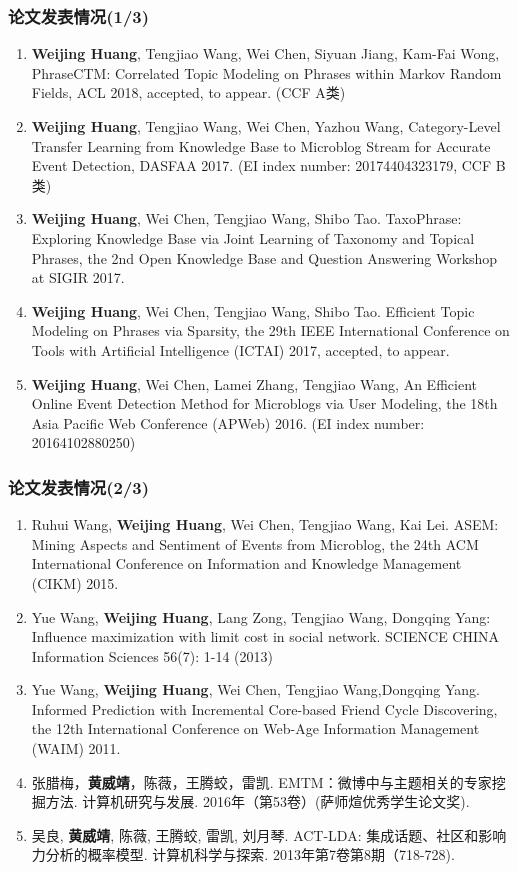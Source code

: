 \begin{frame}[plain]
\frametitle{论文发表情况(1/3)}

\footnotesize
\begin{enumerate}
\item \textbf{Weijing Huang}, Tengjiao Wang, Wei Chen, Siyuan Jiang, Kam-Fai Wong, PhraseCTM: Correlated Topic Modeling on Phrases within Markov Random Fields, ACL 2018, accepted, to appear. (CCF A类) 
\item \textbf{Weijing Huang}, Tengjiao Wang, Wei Chen, Yazhou Wang, Category-Level Transfer Learning from Knowledge Base to Microblog Stream for Accurate Event Detection, DASFAA 2017. (EI index number: 20174404323179, CCF B类)
\item \textbf{Weijing Huang}, Wei Chen, Tengjiao Wang, Shibo Tao. TaxoPhrase: Exploring Knowledge Base via Joint Learning of Taxonomy and Topical Phrases, the 2nd Open Knowledge Base and Question Answering Workshop at SIGIR 2017.
\item \textbf{Weijing Huang}, Wei Chen, Tengjiao Wang, Shibo Tao. Efficient Topic Modeling on Phrases via Sparsity, the 29th IEEE International Conference on Tools with Artificial Intelligence (ICTAI) 2017, accepted, to appear. 
\item \textbf{Weijing Huang}, Wei Chen, Lamei Zhang, Tengjiao Wang, An Efficient Online Event Detection Method for Microblogs via User Modeling, the 18th Asia Pacific Web Conference (APWeb) 2016. (EI index number: 20164102880250)
\end{enumerate}
\end{frame}

\begin{frame}[plain]
\frametitle{论文发表情况(2/3)}

\footnotesize
\begin{enumerate}\addtocounter{enumi}{5}
\item Ruhui Wang, \textbf{Weijing Huang}, Wei Chen, Tengjiao Wang, Kai Lei. ASEM: Mining Aspects and Sentiment of Events from Microblog, the 24th ACM International Conference on Information and Knowledge Management (CIKM) 2015.
\item Yue Wang, \textbf{Weijing Huang}, Lang Zong, Tengjiao Wang, Dongqing Yang: Influence maximization with limit cost in social network. SCIENCE CHINA Information Sciences 56(7): 1-14 (2013) 
\item Yue Wang, \textbf{Weijing Huang}, Wei Chen, Tengjiao Wang,Dongqing Yang. Informed Prediction with Incremental Core-based Friend Cycle Discovering, the 12th International Conference on Web-Age Information Management (WAIM) 2011. 
\item 张腊梅，\textbf{黄威靖}，陈薇，王腾蛟，雷凯. EMTM：微博中与主题相关的专家挖掘方法. 计算机研究与发展. 2016年（第53卷）(萨师煊优秀学生论文奖).
\item 吴良, \textbf{黄威靖}, 陈薇, 王腾蛟, 雷凯, 刘月琴. ACT-LDA: 集成话题、社区和影响力分析的概率模型. 计算机科学与探索. 2013年第7卷第8期（718-728). 
\end{enumerate}
\end{frame}

